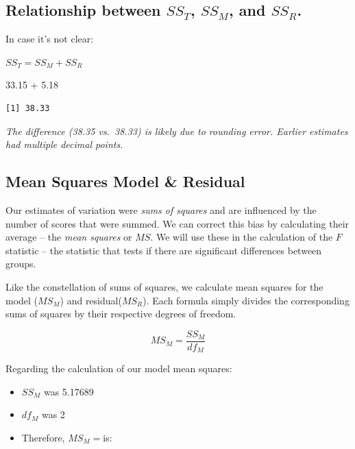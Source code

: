 \documentclass[
  english,
]{book}
\newenvironment{Shaded}{\begin{snugshade}}{\end{snugshade}}
\newcommand{\FloatTok}[1]{\textcolor[rgb]{0.00,0.00,0.81}{#1}}
\newcommand{\SpecialCharTok}[1]{\textcolor[rgb]{0.00,0.00,0.00}{#1}}
\providecommand{\tightlist}{%
  \setlength{\itemsep}{0pt}\setlength{\parskip}{0pt}}
\begin{document}
\hypertarget{relationship-between-ss_t-ss_m-and-ss_r.}{%
\subsection{\texorpdfstring{Relationship between \(SS_T\), \(SS_M\), and \(SS_R\).}{Relationship between SS\_T, SS\_M, and SS\_R.}}\label{relationship-between-ss_t-ss_m-and-ss_r.}}

In case it's not clear:

\(SS_T = SS_M + SS_R\)

\begin{Shaded}
\begin{Highlighting}[]
\FloatTok{33.15} \SpecialCharTok{+} \FloatTok{5.18}
\end{Highlighting}
\end{Shaded}

\begin{verbatim}
[1] 38.33
\end{verbatim}

\emph{The difference (38.35 vs.~38.33) is likely due to rounding error. Earlier estimates had multiple decimal points.}

\hypertarget{mean-squares-model-residual}{%
\subsection{Mean Squares Model \& Residual}\label{mean-squares-model-residual}}

Our estimates of variation were \emph{sums of squares} and are influenced by the number of scores that were summed. We can correct this bias by calculating their average -- the \emph{mean squares} or \(MS\). We will use these in the calculation of the \(F\) statistic -- the statistic that tests if there are significant differences between groups.

Like the constellation of sums of squares, we calculate mean squares for the model (\(MS_M\)) and residual(\(MS_R\)). Each formula simply divides the corresponding sums of squares by their respective degrees of freedom.

\[MS_M = \frac{SS_{M}}{df{_{M}}}\]

Regarding the calculation of our model mean squares:

\begin{itemize}
\tightlist
\item
  \(SS_M\) was 5.17689
\item
  \(df_M\) was 2
\item
  Therefore, \(MS_M=\)is:
\end{itemize}
\end{document}
